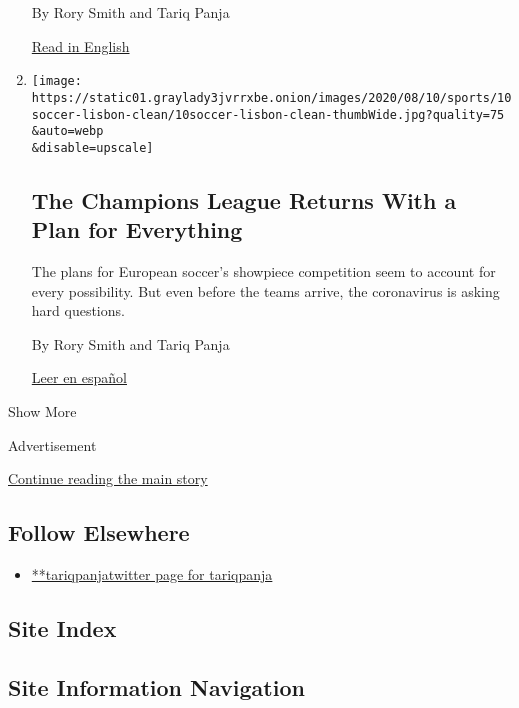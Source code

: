 \begin{enumerate}
  By Rory Smith and Tariq Panja

  \href{https://www.nytimes3xbfgragh.onion/2020/08/10/sports/soccer/champions-league-lisbon.html}{Read
  in English}
\item
  \href{/2020/08/10/sports/soccer/champions-league-lisbon.html}{}

  \texttt{[image: https://static01.graylady3jvrrxbe.onion/images/2020/08/10/sports/10soccer-lisbon-clean/10soccer-lisbon-clean-thumbWide.jpg?quality=75\\\&auto=webp\\\&disable=upscale]}

  \hypertarget{the-champions-league-returns-with-a-plan-for-everything}{%
  \subsection{The Champions League Returns With a Plan for
  Everything}\label{the-champions-league-returns-with-a-plan-for-everything}}

  The plans for European soccer's showpiece competition seem to account
  for every possibility. But even before the teams arrive, the
  coronavirus is asking hard questions.

  By Rory Smith and Tariq Panja

  \href{https://www.nytimes3xbfgragh.onion/es/2020/08/11/espanol/deportes/champions-league-covid-reinicio.html}{Leer
  en español}
\end{enumerate}

Show More

Advertisement

\protect\hyperlink{after-mid2}{Continue reading the main story}

\hypertarget{follow-elsewhere}{%
\subsection{Follow Elsewhere}\label{follow-elsewhere}}

\begin{itemize}
\tightlist
\item
  \href{https://twitter.com/tariqpanja}{**tariqpanjatwitter page for
  tariqpanja}
\end{itemize}

\hypertarget{site-index}{%
\subsection{Site Index}\label{site-index}}

\hypertarget{site-information-navigation}{%
\subsection{Site Information
Navigation}\label{site-information-navigation}}

